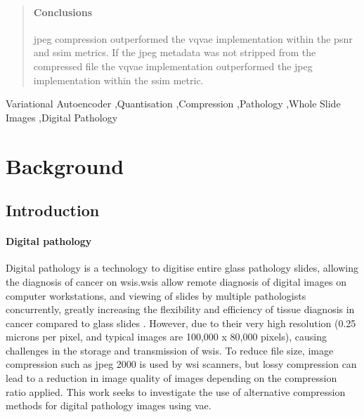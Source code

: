 \documentclass[review]{elsarticle}
\begin{document}
\begin{frontmatter}
\begin{abstract}
\paragraph{Conclusions}
\gls{jpeg} compression outperformed the \gls{vqvae} implementation within the \gls{psnr} and \gls{ssim} metrics. If the \gls{jpeg} metadata was not stripped from the compressed file the \gls{vqvae} implementation outperformed the \gls{jpeg} implementation within the \gls{ssim} metric.

\end{abstract}
\begin{keyword}
 Variational Autoencoder \sep Quantisation \sep Compression \sep Pathology \sep Whole Slide Images \sep Digital Pathology
\end{keyword}

\end{frontmatter}

\linenumbers

\section{Background}
\subsection{Introduction}
\paragraph{Digital pathology} Digital pathology is a technology to digitise entire glass pathology slides, allowing the diagnosis of cancer on \glspl{wsi}.\glspl{wsi} allow remote diagnosis of digital images on computer workstations, and viewing of slides by multiple pathologists concurrently, greatly increasing the flexibility and efficiency of tissue diagnosis in cancer compared to glass slides \cite{williams_future-proofing_2017, williams_future-proofing_2019}. However, due to their very high resolution (0.25 microns per pixel, and typical images are 100,000 x 80,000 pixels), causing challenges in the storage and transmission of \glspl{wsi}. To reduce file size, image compression such as \gls{jpeg} 2000 is used by \gls{wsi} scanners, but lossy compression can lead to a reduction in image quality of images depending on the compression ratio applied. This work seeks to investigate the use of alternative compression methods for digital pathology images using \gls{vae}.
\end{document}
